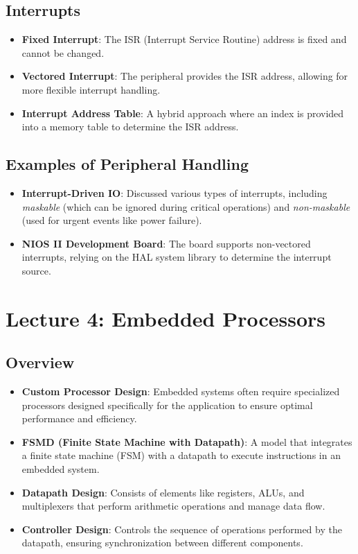 \documentclass[
  14pt,
  a4paper,
  DIV=11,
  numbers=noendperiod,
  headinclude=true,
  footinclude=true]{scrreprt}
\providecommand{\tightlist}{%
  \setlength{\itemsep}{0pt}\setlength{\parskip}{0pt}}\usepackage{longtable,booktabs,array}
\begin{document}
\section{Interrupts}\label{interrupts}

\begin{itemize}
\tightlist
\item
  \textbf{Fixed Interrupt}: The ISR (Interrupt Service Routine) address
  is fixed and cannot be changed.
\item
  \textbf{Vectored Interrupt}: The peripheral provides the ISR address,
  allowing for more flexible interrupt handling.
\item
  \textbf{Interrupt Address Table}: A hybrid approach where an index is
  provided into a memory table to determine the ISR address.
\end{itemize}

\section{Examples of Peripheral
Handling}\label{examples-of-peripheral-handling}

\begin{itemize}
\item
  \textbf{Interrupt-Driven IO}: Discussed various types of interrupts,
  including \emph{maskable} (which can be ignored during critical
  operations) and \emph{non-maskable} (used for urgent events like power
  failure).
\item
  \textbf{NIOS II Development Board}: The board supports non-vectored
  interrupts, relying on the HAL system library to determine the
  interrupt source.
\end{itemize}

\chapter{Lecture 4: Embedded
Processors}\label{lecture-4-embedded-processors}

\section{Overview}\label{overview-1}

\begin{itemize}
\tightlist
\item
  \textbf{Custom Processor Design}: Embedded systems often require
  specialized processors designed specifically for the application to
  ensure optimal performance and efficiency.
\item
  \textbf{FSMD (Finite State Machine with Datapath)}: A model that
  integrates a finite state machine (FSM) with a datapath to execute
  instructions in an embedded system.
\item
  \textbf{Datapath Design}: Consists of elements like registers, ALUs,
  and multiplexers that perform arithmetic operations and manage data
  flow.
\item
  \textbf{Controller Design}: Controls the sequence of operations
  performed by the datapath, ensuring synchronization between different
  components.
\end{itemize}
\end{document}
